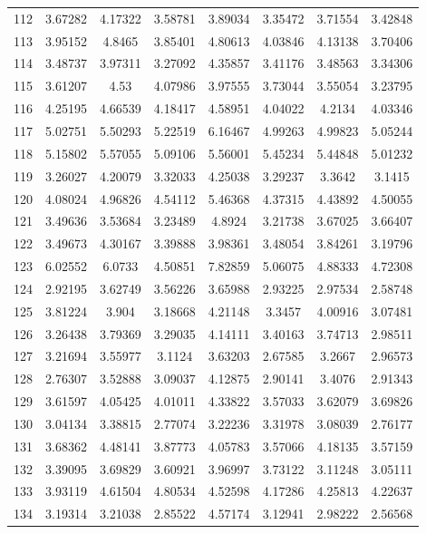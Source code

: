 \begin{center}
\begin{longtable}{cccccccc}
112 & 3.67282 & 4.17322 & 3.58781 & 3.89034 & 3.35472 & 3.71554 & 3.42848\\
113 & 3.95152 & 4.8465 & 3.85401 & 4.80613 & 4.03846 & 4.13138 & 3.70406\\
114 & 3.48737 & 3.97311 & 3.27092 & 4.35857 & 3.41176 & 3.48563 & 3.34306\\
115 & 3.61207 & 4.53 & 4.07986 & 3.97555 & 3.73044 & 3.55054 & 3.23795\\
116 & 4.25195 & 4.66539 & 4.18417 & 4.58951 & 4.04022 & 4.2134 & 4.03346\\
117 & 5.02751 & 5.50293 & 5.22519 & 6.16467 & 4.99263 & 4.99823 & 5.05244\\
118 & 5.15802 & 5.57055 & 5.09106 & 5.56001 & 5.45234 & 5.44848 & 5.01232\\
119 & 3.26027 & 4.20079 & 3.32033 & 4.25038 & 3.29237 & 3.3642 & 3.1415\\
120 & 4.08024 & 4.96826 & 4.54112 & 5.46368 & 4.37315 & 4.43892 & 4.50055\\
121 & 3.49636 & 3.53684 & 3.23489 & 4.8924 & 3.21738 & 3.67025 & 3.66407\\
122 & 3.49673 & 4.30167 & 3.39888 & 3.98361 & 3.48054 & 3.84261 & 3.19796\\
123 & 6.02552 & 6.0733 & 4.50851 & 7.82859 & 5.06075 & 4.88333 & 4.72308\\
124 & 2.92195 & 3.62749 & 3.56226 & 3.65988 & 2.93225 & 2.97534 & 2.58748\\
125 & 3.81224 & 3.904 & 3.18668 & 4.21148 & 3.3457 & 4.00916 & 3.07481\\
126 & 3.26438 & 3.79369 & 3.29035 & 4.14111 & 3.40163 & 3.74713 & 2.98511\\
127 & 3.21694 & 3.55977 & 3.1124 & 3.63203 & 2.67585 & 3.2667 & 2.96573\\
128 & 2.76307 & 3.52888 & 3.09037 & 4.12875 & 2.90141 & 3.4076 & 2.91343\\
129 & 3.61597 & 4.05425 & 4.01011 & 4.33822 & 3.57033 & 3.62079 & 3.69826\\
130 & 3.04134 & 3.38815 & 2.77074 & 3.22236 & 3.31978 & 3.08039 & 2.76177\\
131 & 3.68362 & 4.48141 & 3.87773 & 4.05783 & 3.57066 & 4.18135 & 3.57159\\
132 & 3.39095 & 3.69829 & 3.60921 & 3.96997 & 3.73122 & 3.11248 & 3.05111\\
133 & 3.93119 & 4.61504 & 4.80534 & 4.52598 & 4.17286 & 4.25813 & 4.22637\\
134 & 3.19314 & 3.21038 & 2.85522 & 4.57174 & 3.12941 & 2.98222 & 2.56568\\

\end{longtable}
\end{center}
